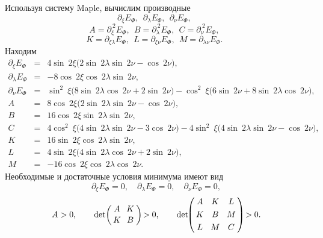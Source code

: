 \documentclass[a4paper]{report}
\begin{document}
Используя систему Maple, вычислим производные
\begin{equation*}
\partial_\xi E_{\Phi},\,\; \partial_\lambda E_{\Phi},\,\; \partial_\nu E_{\Phi},\,\;
\end{equation*}
\begin{equation*}
A=\partial_\xi^{\:\!2}E_{\Phi},\,\; B=\partial_\lambda^{\:\!2}E_{\Phi},\,\; C=\partial_\nu^{\:\!2}E_{\Phi},\,\;
\end{equation*}
\begin{equation*}
K= \partial_{\xi\lambda}E_{\Phi},\,\; L=\partial_{\xi\nu}E_{\Phi},\,\; M=\partial_{\lambda\nu}E_{\Phi}.\,\;
\end{equation*}
Находим
\begin{eqnarray*}
\partial_\xi E_{\Phi} &=& 4\sin\:\!\!2\xi\big(2\sin\:\!\!2\lambda\sin\:\!\!2\nu- \cos\:\!\!2\nu\big),
\\
\partial_\lambda E_{\Phi} &=& -8\cos\:\!\!2\xi\cos\:\!\!2\lambda\sin\:\!\!2\nu, \\
\partial_\nu E_{\Phi} &=& \sin^2\:\!\!\xi\big(8\sin\:\!\!2\lambda\cos\:\!\!2\nu+ 2\sin\:\!\!2\nu\big)-
\cos^2\:\!\!\xi\big(6\sin\:\!\!2\nu+ 8\sin\:\!\!2\lambda\cos\:\!\!2\nu\big),
\\
A &=& 8\cos\:\!\!2\xi \big(2\sin\:\!\!2\lambda\sin\:\!\!2\nu-\cos\:\!\!2\nu\big),
\\
B &=& 16\cos\:\!\!2\xi \sin\:\!\!2\lambda \sin\:\!\!2\nu,
\\
C &=& 4\cos^2\:\!\!\xi\big(4\sin\:\!\!2\lambda\sin\:\!\!2\nu- 3\cos\:\!\!2\nu\big) -4\sin^2\:\!\!\xi\big(4\sin\:\!\!2\lambda\sin\:\!\!2\nu- \cos\:\!\!2\nu\big),
\\
K &=& 16\sin\:\!\!2\xi \cos\:\!\!2\lambda \sin\:\!\!2\nu,
\\
L &=& 4\sin\:\!\!2\xi \big(4\sin\:\!\!2\lambda\cos\:\!\!2\nu+ 2\sin\:\!\!2\nu\big),
\\
M &=& -16\cos\:\!\!2\xi \cos\:\!\!2\lambda \cos\:\!\!2\nu.
\end{eqnarray*}
Необходимые и достаточные условия минимума имеют вид
\begin{equation}\label{ExtrConds}
\partial_\xi E_{\Phi}=0,\quad \partial_\lambda E_{\Phi}=0,\quad \partial_\nu E_{\Phi}=0,
\nonumber
\end{equation}
\begin{equation}\label{}
A>0,\qquad
\det\!\left(\!\!
\begin{array}{cc}
A&\!\! K \\
K&\!\! B\vphantom{\hat{A}}
\end{array}
\!\!\!\:\right)\!>0,
\qquad
\det\!\!\!\:\left(\!\!
\begin{array}{ccc}
A&\! K&\! L \\[2pt]
K&\! B&\! M\vphantom{\hat{A}}  \\[2pt]
L&\! M&\! C\vphantom{\hat{A}}
\end{array}
\!\!\right)\!>0.
\nonumber
\end{equation}
\end{document}
